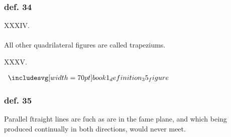 \hfill

\begin{minipage}{0.1\textwidth}
  \phantom{}
\end{minipage}%
\begin{minipage}{0.8\textwidth}
  \subsubsection{def. 34}
  \begin{center}
    XXXIV.\label{book1def34}\\
    \hfill\\
    All other quadrilateral figures are called trapeziums.\\
  \end{center}
\end{minipage}%
\begin{minipage}{0.1\textwidth}
  \phantom{}
\end{minipage}%

\hfill

\begin{center}
  XXXV.\label{book1def35}\\
\end{center}
\begin{minipage}{0.33\textwidth}
  \begin{center}
    $\img[0][0][70]{book1_definition_35_figure}$
  \end{center}
\end{minipage}%
\begin{minipage}{0.67\textwidth}
  \subsubsection{def. 35}
  \begin{center}
    \raggedright Parallel ſtraight lines are ſuch as are in the ſame plane, and which being produced continually in both directions, would never meet.
  \end{center}
\end{minipage}

\hfill

\hfill

